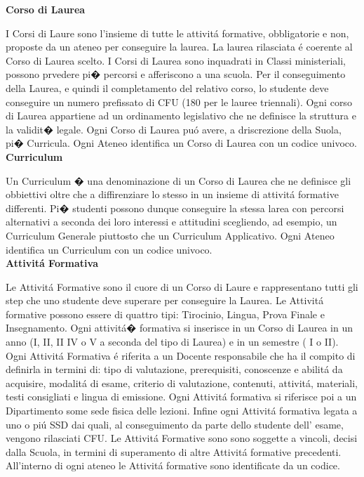 \documentclass[a4paper,12pt,italian,towside]{article}
\begin{document}
\textbf{Corso di Laurea}
\par
I Corsi di Laure sono l'insieme di tutte le attivit\'a formative, obbligatorie e non, proposte da un ateneo per conseguire la laurea. La laurea rilasciata \'e coerente al Corso di Laurea scelto. I Corsi di Laurea sono inquadrati in Classi ministeriali, possono prvedere pi� percorsi e afferiscono a una scuola. Per il conseguimento della Laurea, e quindi il completamento del relativo corso, lo studente deve conseguire un numero prefissato di CFU (180 per le lauree triennali). Ogni corso di Laurea appartiene ad un ordinamento legislativo che ne definisce la struttura e la validit� legale. Ogni Corso di Laurea pu\'o avere, a driscrezione della Suola, pi� Curricula. Ogni Ateneo identifica un Corso di Laurea con un codice univoco.\\


\textbf{Curriculum}
\par
Un Curriculum � una denominazione di un Corso di Laurea che ne definisce gli obbiettivi oltre che a diffirenziare lo stesso in un insieme di attivit\'a formative differenti. Pi� studenti possono dunque conseguire la stessa larea con percorsi alternativi a seconda dei loro interessi e attitudini scegliendo, ad esempio, un Curriculum Generale piuttosto che un Curriculum Applicativo.
Ogni Ateneo identifica un Curriculum con un codice univoco.\\


\textbf{Attivit\'a Formativa}
\par
Le Attivit\'a Formative sono il cuore di un Corso di Laure e rappresentano tutti gli step che uno studente deve superare per conseguire la Laurea. Le Attivit\'a formative possono essere di quattro tipi: Tirocinio, Lingua, Prova Finale e Insegnamento. Ogni attivit\'a� formativa si inserisce in un Corso di Laurea in un anno (I, II, II IV o V a seconda del tipo di Laurea) e in un semestre ( I o II). Ogni Attivit\'a Formativa \'e riferita a un Docente responsabile che ha il compito di definirla in termini di: tipo di valutazione, prerequisiti, conoscenze e abilit\'a da acquisire, modalit\'a di esame, criterio di valutazione, contenuti, attivit\'a, materiali, testi consigliati e lingua di emissione. Ogni Attivit\'a formativa si riferisce poi a un Dipartimento some sede fisica delle lezioni. Infine ogni Attivit\'a formativa  legata a uno o pi\'u SSD dai quali, al conseguimento da parte dello studente dell' esame, vengono rilasciati CFU. Le Attivit\'a Formative sono sono soggette a vincoli, decisi dalla Scuola, in termini di superamento di altre Attivit\'a formative precedenti. All'interno di ogni ateneo le Attivit\'a formative sono identificate da un codice.\\
\end{document}
